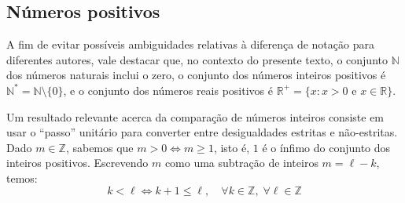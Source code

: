 \subsection*{Números positivos}

A fim de evitar possíveis ambiguidades
relativas à diferença de notação para diferentes autores,
vale destacar que, no contexto do presente texto,
o conjunto $\mathds{N}$ dos números naturais inclui o zero,
o conjunto dos números inteiros positivos é
$\mathds{N}^* = \mathds{N} \setminus \{0\}$,
e o conjunto dos números reais positivos é
$\mathds{R}^+ = \{x: x > 0 \text{ e } x \in \mathds{R}\}$.

Um resultado relevante acerca da comparação de números inteiros
consiste em usar o ``passo'' unitário
para converter entre desigualdades estritas e não-estritas.
Dado $m \in \mathds{Z}$, sabemos que $m > 0 \iff m \ge 1$,
isto é, $1$ é o ínfimo do conjunto dos inteiros positivos.
Escrevendo $m$ como uma subtração de inteiros $m = \ell - k$, temos:
\begin{equation}\label{int+1}
  k < \ell \iff k + 1 \le \ell,
  \quad \forall k \in \mathds{Z}, \; \forall \ell \in \mathds{Z}
\end{equation}
